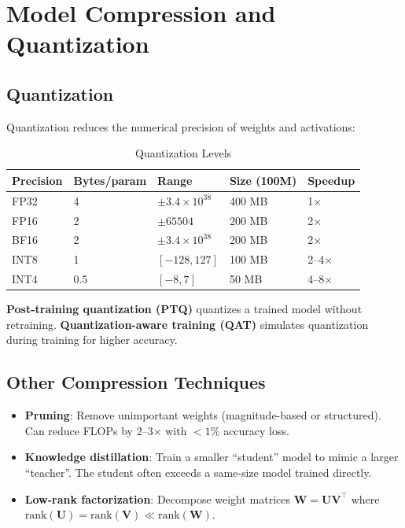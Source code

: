 \section{Model Compression and Quantization}

\subsection{Quantization}

Quantization reduces the numerical precision of weights and activations:

\begin{table}[ht]
    \centering
    \caption{Quantization Levels}
    \begin{tabular}{L{2cm} L{2.5cm} L{2.5cm} L{2.5cm} L{2.5cm}}
        \toprule
        \textbf{Precision} & \textbf{Bytes/param} & \textbf{Range} & \textbf{Size (100M)} & \textbf{Speedup} \\
        \midrule
        FP32 & 4 & $\pm 3.4\times10^{38}$ & 400 MB & 1$\times$ \\
        FP16 & 2 & $\pm 65504$ & 200 MB & 2$\times$ \\
        BF16 & 2 & $\pm 3.4\times10^{38}$ & 200 MB & 2$\times$ \\
        INT8 & 1 & $[-128, 127]$ & 100 MB & 2--4$\times$ \\
        INT4 & 0.5 & $[-8, 7]$ & 50 MB & 4--8$\times$ \\
        \bottomrule
    \end{tabular}
\end{table}

\textbf{Post-training quantization (PTQ)} quantizes a trained model without retraining. \textbf{Quantization-aware training (QAT)} simulates quantization during training for higher accuracy.

\subsection{Other Compression Techniques}

\begin{itemize}
    \item \textbf{Pruning}: Remove unimportant weights (magnitude-based or structured). Can reduce FLOPs by 2--3$\times$ with $<1\%$ accuracy loss.
    \item \textbf{Knowledge distillation}: Train a smaller ``student'' model to mimic a larger ``teacher''. The student often exceeds a same-size model trained directly.
    \item \textbf{Low-rank factorization}: Decompose weight matrices $\mathbf{W} = \mathbf{U}\mathbf{V}^\top$ where $\text{rank}(\mathbf{U}) = \text{rank}(\mathbf{V}) \ll \text{rank}(\mathbf{W})$.
\end{itemize}

